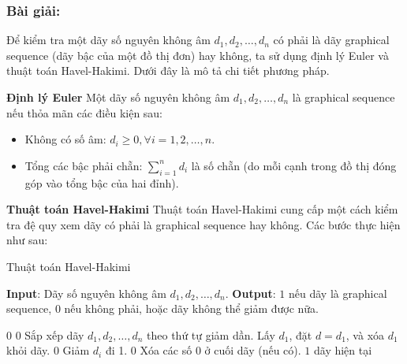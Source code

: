 \documentclass[a4paper,12pt]{article}
\begin{document}
\subsubsection*{Bài giải:}
Để kiểm tra một dãy số nguyên không âm \(d_1, d_2, \ldots, d_n\) có phải là dãy graphical sequence (dãy bậc của một đồ thị đơn) hay không, ta sử dụng định lý Euler và thuật toán Havel-Hakimi. Dưới đây là mô tả chi tiết phương pháp.

\textbf{Định lý Euler}
Một dãy số nguyên không âm \(d_1, d_2, \ldots, d_n\) là graphical sequence nếu thỏa mãn các điều kiện sau:
\begin{itemize}
    \item Không có số âm: \(d_i \geq 0, \forall i = 1, 2, \ldots, n\).
    \item Tổng các bậc phải chẵn: \(\sum_{i=1}^n d_i\) là số chẵn (do mỗi cạnh trong đồ thị đóng góp vào tổng bậc của hai đỉnh).
\end{itemize}

\textbf{Thuật toán Havel-Hakimi}
Thuật toán Havel-Hakimi cung cấp một cách kiểm tra đệ quy xem dãy có phải là graphical sequence hay không. Các bước thực hiện như sau:

\begin{algorithm}
\caption{Thuật toán Havel-Hakimi}
\begin{algorithmic}[1]
\State \textbf{Input}: Dãy số nguyên không âm \(d_1, d_2, \ldots, d_n\).
\State \textbf{Output}: \(1\) nếu dãy là graphical sequence, \(0\) nếu không phải, hoặc dãy không thể giảm được nữa.

        \State \Return \(0\) 
    \EndIf
        \State \Return \(0\) 
    \EndIf
        \State Sắp xếp dãy \(d_1, d_2, \ldots, d_n\) theo thứ tự giảm dần.
        \State Lấy \(d_1\), đặt \(d = d_1\), và xóa \(d_1\) khỏi dãy.
            \State \Return \(0\) 
        \EndIf
            \State Giảm \(d_i\) đi 1.
        \EndFor
            \State \Return \(0\) 
        \EndIf
        \State Xóa các số 0 ở cuối dãy (nếu có).
    \EndWhile
        \State \Return \(1\) 
    \Else
        \State \Return dãy hiện tại 
    \EndIf
\EndFunction
\end{algorithmic}
\end{algorithm}
\end{document}

